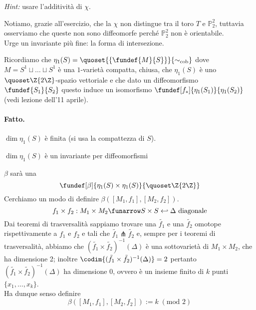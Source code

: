 \noindent \emph{Hint:} usare l'additività di $\chi$.

\begin{oss}
Notiamo, grazie all'esercizio, che la $\chi$ non distingue tra il toro $T$ e $\mathbb{P}_2^2$, tuttavia osserviamo che queste non sono diffeomorfe perché $\mathbb{P}_2^2$ non è orientabile. \\
Urge un invariante più fine: la forma di intersezione.
\end{oss}


Ricordiamo che $\eta_1(S) = \quoset{ \{ \fundef{M}{S} \} }{\sim_\text{cob}}$ dove $M = S^1 \sqcup \dots \sqcup S^1$ è una $1$-varietà compatta, chiusa, che $\eta_1(S)$ è uno $\quoset\Z{2\Z}$-spazio vettoriale e che dato un diffeomorfismo $\fundef{S_1}{S_2}$ questo induce un isomorfismo $\fundef[f_*]{\eta_1(S_1)}{\eta_1(S_2)}$ (vedi lezione dell'11 aprile).

\paragraph{Fatto.}  $\dim \eta_1(S)$ è finita (si usa la compattezza di $S$).

\begin{cor}
	$\dim \eta_1(S)$ è un invariante per diffeomorfismi
\end{cor}

\begin{defn} $\beta$ sarà una \[ \fundef[\beta]{\eta_1(S) \times \eta_1(S)}{\quoset\Z{2\Z}} \] Cerchiamo un modo di definire $\beta([M_1,f_1],[M_2,f_2])$.
\[ f_1 \times f_2: M_1 \times M_2 \funarrow S \times S \hookleftarrow \Delta \text{ diagonale} \]
Dai teoremi di trasversalità sappiamo trovare una $\tilde{f_1}$ e una $\tilde{f_2}$ omotope rispettivamente a $f_1$ e $f_2$ e tali che $\tilde{f_1} \pitchfork \tilde{f_2}$ e, sempre per i teoremi di trasversalità, abbiamo che $(\tilde{f_1} \times \tilde{f_2})^{-1}(\Delta)$ è una sottovarietà di $M_1 \times M_2$, che ha dimensione 2; inoltre $\codim{(\tilde{f_1} \times \tilde{f_2})^{-1}(\Delta)} = 2$ pertanto $(\tilde{f_1} \times \tilde{f_2})^{-1}(\Delta)$ ha dimensione $0$, ovvero è un insieme finito di $k$ punti $\{x_1, \dots , x_k \}$. \\
Ha dunque senso definire \[ \beta([M_1,f_1],[M_2,f_2]) := k \; (\text{mod } 2) \]
\end{defn}

